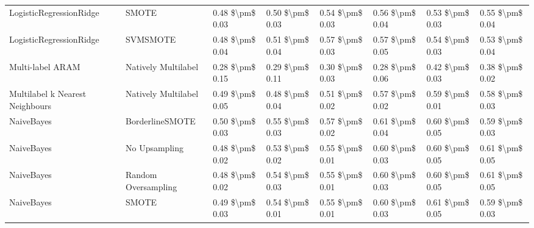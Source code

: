\begin{tabular}{llllllll}
        LogisticRegressionRidge &                         SMOTE & 0.48 \$\textbackslash pm\$ 0.03 &           0.50 \$\textbackslash pm\$ 0.03 &       0.54 \$\textbackslash pm\$ 0.03 &        0.56 \$\textbackslash pm\$ 0.04 &                         0.53 \$\textbackslash pm\$ 0.03 &     0.55 \$\textbackslash pm\$ 0.04 \\
        LogisticRegressionRidge &                      SVMSMOTE & 0.48 \$\textbackslash pm\$ 0.04 &           0.51 \$\textbackslash pm\$ 0.04 &       0.57 \$\textbackslash pm\$ 0.03 &        0.57 \$\textbackslash pm\$ 0.05 &                         0.54 \$\textbackslash pm\$ 0.03 &     0.53 \$\textbackslash pm\$ 0.04 \\
               Multi-label ARAM &           Natively Multilabel & 0.28 \$\textbackslash pm\$ 0.15 &           0.29 \$\textbackslash pm\$ 0.11 &       0.30 \$\textbackslash pm\$ 0.03 &        0.28 \$\textbackslash pm\$ 0.06 &                         0.42 \$\textbackslash pm\$ 0.03 &     0.38 \$\textbackslash pm\$ 0.02 \\
Multilabel k Nearest Neighbours &           Natively Multilabel & 0.49 \$\textbackslash pm\$ 0.05 &           0.48 \$\textbackslash pm\$ 0.04 &       0.51 \$\textbackslash pm\$ 0.02 &        0.57 \$\textbackslash pm\$ 0.02 &                         0.59 \$\textbackslash pm\$ 0.01 &     0.58 \$\textbackslash pm\$ 0.03 \\
                     NaiveBayes &               BorderlineSMOTE & 0.50 \$\textbackslash pm\$ 0.03 &           0.55 \$\textbackslash pm\$ 0.03 &       0.57 \$\textbackslash pm\$ 0.02 &        0.61 \$\textbackslash pm\$ 0.04 &                         0.60 \$\textbackslash pm\$ 0.05 &     0.59 \$\textbackslash pm\$ 0.03 \\
                     NaiveBayes &                 No Upsampling & 0.48 \$\textbackslash pm\$ 0.02 &           0.53 \$\textbackslash pm\$ 0.02 &       0.55 \$\textbackslash pm\$ 0.01 &        0.60 \$\textbackslash pm\$ 0.03 &                         0.60 \$\textbackslash pm\$ 0.05 &     0.61 \$\textbackslash pm\$ 0.05 \\
                     NaiveBayes &           Random Oversampling & 0.48 \$\textbackslash pm\$ 0.02 &           0.54 \$\textbackslash pm\$ 0.03 &       0.55 \$\textbackslash pm\$ 0.01 &        0.60 \$\textbackslash pm\$ 0.03 &                         0.60 \$\textbackslash pm\$ 0.05 &     0.61 \$\textbackslash pm\$ 0.05 \\
                     NaiveBayes &                         SMOTE & 0.49 \$\textbackslash pm\$ 0.03 &           0.54 \$\textbackslash pm\$ 0.01 &       0.55 \$\textbackslash pm\$ 0.01 &        0.60 \$\textbackslash pm\$ 0.03 &                         0.61 \$\textbackslash pm\$ 0.05 &     0.59 \$\textbackslash pm\$ 0.03 \\

\end{tabular}
